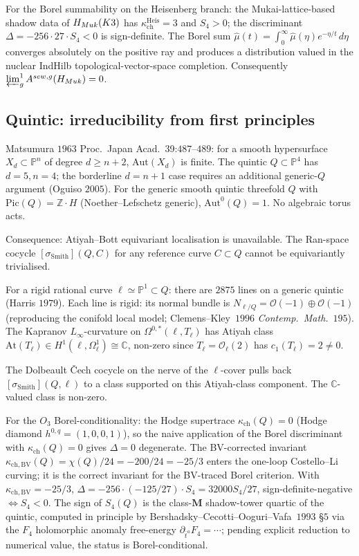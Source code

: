 \documentclass[11pt]{amsart}
\newcommand{\kch}{\kappa_{\mathrm{ch}}}
\newcommand{\kchBV}{\kappa_{\mathrm{ch},\mathrm{BV}}}
\newcommand{\cO}{\mathcal{O}}
\newcommand{\At}{\mathrm{At}}
\newcommand{\bP}{\mathbb{P}}
\newcommand{\bC}{\mathbb{C}}
\newcommand{\bZ}{\mathbb{Z}}
\newcommand{\Aut}{\mathrm{Aut}}
\begin{document}
For the Borel summability on the Heisenberg branch: the
Mukai-lattice-based shadow data of $H_{Muk}(K3)$ has
$\kch^{\mathrm{Heis}} = 3$ and $S_4 > 0$; the discriminant
$\Delta = -256 \cdot 27 \cdot S_4 < 0$ is sign-definite. The
Borel sum
$\hat\mu(t) = \int_0^\infty \widehat{\mu}(\eta) e^{-\eta/t}
\, d\eta$ converges absolutely on the positive ray and
produces a distribution valued in the nuclear IndHilb
topological-vector-space completion. Consequently
$\varprojlim^1_g A^{sew, g}(H_{Muk}) = 0$.

\subsection{Quintic: irreducibility from first principles}

Matsumura $1963$ Proc.\ Japan Acad.\ 39:$487$--$489$: for a smooth
hypersurface $X_d \subset \bP^n$ of degree $d \geq n+2$,
$\Aut(X_d)$ is finite. The quintic $Q \subset \bP^4$ has
$d = 5, n = 4$; the borderline $d = n + 1$ case requires an
additional generic-$Q$ argument (Oguiso $2005$). For the generic
smooth quintic threefold $Q$ with $\mathrm{Pic}(Q) = \bZ \cdot H$
(Noether--Lefschetz generic), $\Aut^0(Q) = 1$. No algebraic torus
acts.

Consequence: Atiyah--Bott equivariant localisation is unavailable.
The Ran-space cocycle $[\sigma_{\mathrm{Smith}}](Q, C)$ for any
reference curve $C \subset Q$ cannot be equivariantly trivialised.

For a rigid rational curve $\ell \simeq \bP^1 \subset Q$: there are
$2875$ lines on a generic quintic (Harris $1979$). Each line is
rigid: its normal bundle is $N_{\ell/Q} = \cO(-1) \oplus \cO(-1)$
(reproducing the conifold local model; Clemens--Kley~$1996$
\emph{Contemp.\ Math.}~$195$). The Kapranov
$L_\infty$-curvature on $\Omega^{0, *}(\ell, T_\ell)$ has Atiyah
class $\At(T_\ell) \in H^1(\ell, \Omega^1_\ell) \cong \bC$,
non-zero since $T_\ell = \cO_\ell(2)$ has $c_1(T_\ell) = 2 \neq 0$.

The Dolbeault \v{C}ech cocycle on the nerve of the $\ell$-cover
pulls back $[\sigma_{\mathrm{Smith}}](Q, \ell)$ to a class
supported on this Atiyah-class component. The $\bC$-valued class
is non-zero.

For the $O_3$ Borel-conditionality: the Hodge supertrace
$\kch(Q) = 0$ (Hodge diamond $h^{0, q} = (1, 0, 0, 1)$), so the
naive application of the Borel discriminant with $\kch(Q) = 0$
gives $\Delta = 0$ degenerate. The BV-corrected invariant
$\kchBV(Q) = \chi(Q)/24 = -200/24 = -25/3$ enters the one-loop
Costello--Li curving; it is the correct invariant for the
BV-traced Borel criterion. With $\kchBV = -25/3$,
$\Delta = -256 \cdot (-125/27) \cdot S_4 = 32000 S_4/27$,
sign-definite-negative $\iff S_4 < 0$. The sign of $S_4(Q)$ is the
class-$\mathbf{M}$ shadow-tower quartic of the quintic, computed
in principle by Bershadsky--Cecotti--Ooguri--Vafa~$1993$ \S$5$
via the $F_4$ holomorphic anomaly free-energy
$\partial_{\bar t^a} F_4 = \cdots$; pending explicit reduction to
numerical value, the status is Borel-conditional.
\end{document}

